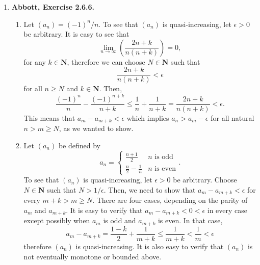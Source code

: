 \documentclass{article}
\DeclarePairedDelimiter\abs{\lvert}{\rvert}
\newcommand{\N}{\mathbf{N}}
\newcommand{\exc}[2][Abbott]{\item \textbf{#1, Exercise #2.}}
\newcommand{\lep}[1][L]{#1et $\epsilon > 0$ be arbitrary}
\begin{document}
\begin{enumerate}
    To verify the second claim, \lep[l]. Since $(x_n)$ and $(y_n)$ are pseudo-Cauchy, we can choose $N \in \N$ such that $\abs*{x_{n+1}-x_n}, \abs*{y_{n+1}-y_n} < \epsilon/2$ for all $n \geq N$. Then, \begin{equation*}
        \abs*{(x_{n+1}+y_{n+1}) - (x_n + y_n)} \leq \abs*{x_{n+1}-x_n} + \abs*{y_{n+1}-y_n} < \epsilon
    \end{equation*} for all $n \geq N$, therefore $(x_n + y_n)$ is also pseudo-Cauchy. 
    
    \exc{2.6.6}
    \begin{enumerate}
        \item Let $(a_n) = (-1)^n/n$. To see that $(a_n)$ is quasi-increasing, \lep[l]. It is easy to see that 
        \begin{equation*}
            \lim_{n \to \infty} \left(\frac{2n+k}{n(n+k)}\right) = 0,
        \end{equation*} for any $k \in \N$, therefore we can choose $N \in \N$ such that
        \begin{equation*}
            \frac{2n+k}{n(n+k)} < \epsilon
        \end{equation*} for all $n \geq N$ and $k \in \N$. Then, 
        \begin{equation*}
            \frac{(-1)^n}{n} - \frac{(-1)^{n+k}}{n+k} \leq \frac{1}{n} + \frac{1}{n+k} = \frac{2n+k}{n(n+k)} < \epsilon.
        \end{equation*} This means that $a_{m}-a_{m+k} < \epsilon$ which implies $a_n > a_m - \epsilon$ for all natural $n > m \geq N$, as we wanted to show.
        
        \item Let $(a_n)$ be defined by 
        \begin{equation*}
            a_n = \begin{cases}
            \frac{n+1}{2} & n \text{ is odd} \\
            \frac{n}{2} - \frac{1}{n} & n \text{ is even}
            \end{cases}.
        \end{equation*} To see that $(a_n)$ is quasi-increasing, \lep[l]. Choose $N \in \N$ such that $N > 1/\epsilon$. Then, we need to show that $a_m - a_{m+k} < \epsilon$ for every $m+k > m \geq N$. There are four cases, depending on the parity of $a_m$ and $a_{m+k}$. It is easy to verify that $a_m-a_{m+k} < 0 < \epsilon$ in every case except possibly when $a_m$ is odd and $a_{m+k}$ is even. In that case, 
        \begin{equation*}
            a_m-a_{m+k} = \frac{1-k}{2} + \frac{1}{m+k} \leq \frac{1}{m+k} < \frac{1}{m} < \epsilon
        \end{equation*} therefore $(a_n)$ is quasi-increasing. It is also easy to verify that $(a_n)$ is not eventually monotone or bounded above.
        

\end{enumerate}
\end{enumerate}
\end{document}
